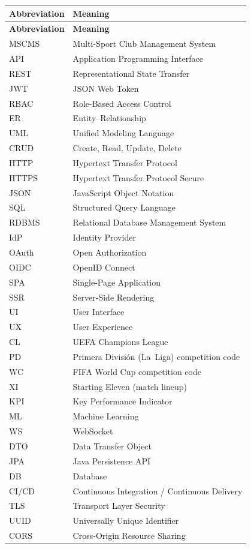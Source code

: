 \documentclass[12pt,a4paper]{report}
\begin{document}
\renewcommand{\arraystretch}{1.3}
\begin{longtable}{p{} p{}}
\toprule
\textbf{Abbreviation} & \textbf{Meaning} \\
\midrule
\endfirsthead
\toprule
\textbf{Abbreviation} & \textbf{Meaning} \\
\midrule
\endhead
\bottomrule
\endlastfoot
MSCMS   & Multi-Sport Club Management System \\
API     & Application Programming Interface \\
REST    & Representational State Transfer \\
JWT     & JSON Web Token \\
RBAC    & Role-Based Access Control \\
ER      & Entity--Relationship \\
UML     & Unified Modeling Language \\
CRUD    & Create, Read, Update, Delete \\
HTTP    & Hypertext Transfer Protocol \\
HTTPS   & Hypertext Transfer Protocol Secure \\
JSON    & JavaScript Object Notation \\
SQL     & Structured Query Language \\
RDBMS   & Relational Database Management System \\
IdP     & Identity Provider \\
OAuth   & Open Authorization \\
OIDC    & OpenID Connect \\
SPA     & Single-Page Application \\
SSR     & Server-Side Rendering \\
UI      & User Interface \\
UX      & User Experience \\
CL      & UEFA Champions League \\
PD      & Primera Divisi\'on (La~Liga) competition code \\
WC      & FIFA World Cup competition code \\
XI      & Starting Eleven (match lineup) \\
KPI     & Key Performance Indicator \\
ML      & Machine Learning \\
WS      & WebSocket \\
DTO     & Data Transfer Object \\
JPA     & Java Persistence API \\
DB      & Database \\
CI/CD   & Continuous Integration / Continuous Delivery \\
TLS     & Transport Layer Security \\
UUID    & Universally Unique Identifier \\
CORS    & Cross-Origin Resource Sharing \\
\end{longtable}
\renewcommand{\arraystretch}{1.0}
\end{document}
